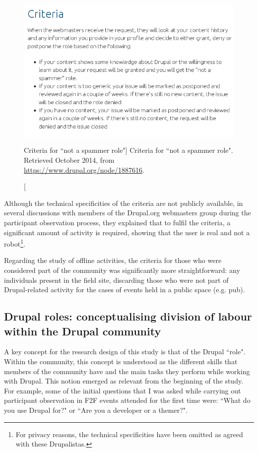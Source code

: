 \begin{figure}[H]
	\centering
	\includegraphics[scale=0.6]{img/quotes_replacement/drupal-not-spammer-role.png}
	\caption[Criteria for ``not a spammer role"]%
	{Criteria for ``not a spammer role". Retrieved  October 2014, from \url{https://www.drupal.org/node/1887616}.}
	\label{not-spammer-quote}
\end{figure}

Although the technical specificities of the criteria are not publicly available, in several discussions with members of the Drupal.org webmasters group during the participant observation process, they explained that to fulfil the criteria, a significant amount of activity is required, showing that the user is real and not a robot\footnote{For privacy reasons, the technical specificities have been omitted as agreed with these Drupalistas.}.

Regarding the study of offline activities, the criteria for those who were considered part of the community was significantly more straightforward: any individuals present in the field site, discarding those who were not part of Drupal-related activity for the cases of events held in a public space (e.g. pub).

\subsection{Drupal roles: conceptualising division of labour within the Drupal community}
\label{par:roles}

A key concept for the research design of this study is that of the Drupal ``role". Within the community, this concept is understood as the different skills that members of the community have and the main tasks they perform while working with Drupal. This notion emerged as relevant from the beginning of the study. For example, some of the initial questions that I was asked while carrying out participant observation in F2F events attended for the first time were: ``What do you use Drupal for?" or ``Are you a developer or a themer?".

